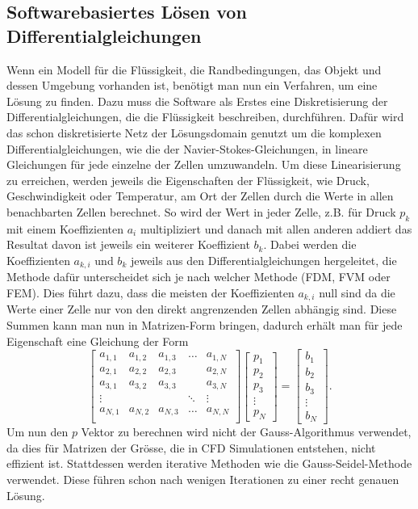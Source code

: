 \subsection{Softwarebasiertes Lösen von Differentialgleichungen}
Wenn ein Modell für die Flüssigkeit, die Randbedingungen, das Objekt und dessen Umgebung vorhanden ist, benötigt man nun ein Verfahren, um eine Lösung zu finden. 
Dazu muss die Software als Erstes eine Diskretisierung der Differentialgleichungen, die die Flüssigkeit beschreiben, durchführen.
Dafür wird das schon diskretisierte Netz der Lösungsdomain genutzt um die komplexen Differentialgleichungen, wie die der Navier-Stokes-Gleichungen, in lineare Gleichungen für jede einzelne der Zellen umzuwandeln.
Um diese Linearisierung zu erreichen, werden jeweils die Eigenschaften der Flüssigkeit, wie Druck, Geschwindigkeit oder Temperatur, am Ort der Zellen durch die Werte in allen benachbarten Zellen berechnet.
So wird der Wert in jeder Zelle, z.B. für Druck $p_{k}$ mit einem Koeffizienten $ a_{i} $ multipliziert und danach mit allen anderen addiert das Resultat davon ist jeweils ein weiterer Koeffizient $b_{k}$.
Dabei werden die Koeffizienten $a_{k,i}$ und $b_{k }$ jeweils aus den Differentialgleichungen hergeleitet, die Methode dafür unterscheidet sich je nach welcher Methode (FDM, FVM oder FEM).
Dies führt dazu, dass die meisten der Koeffizienten $a_{k,i}$ null sind da die Werte einer Zelle nur von den direkt angrenzenden Zellen abhängig sind.
Diese Summen kann man nun in Matrizen-Form bringen, dadurch erhält man für jede Eigenschaft eine Gleichung der Form
\begin{equation}
\begin{bmatrix}
	a_{1,1} &  a_{1,2} & a_{1,3} & \dots & a_{1,N} \\
	a_{2,1} &  a_{2,2} & a_{2,3} &  & a_{2,N} \\
	a_{3,1} &  a_{3,2} & a_{3,3} &  & a_{3,N} \\
	\vdots & &  & \ddots & \vdots \\
	a_{N,1} &  a_{N,2} & a_{N,3} & \dots & a_{N,N} \\
\end{bmatrix}
\begin{bmatrix}
	p_{1} \\
	p_{2} \\
	p_{3} \\
	\vdots \\
	p_{N}
\end{bmatrix}
= 
\begin{bmatrix}
b_{1} \\
b_{2} \\
b_{3} \\
\vdots \\
b_{N}
\end{bmatrix}
.
\end{equation}
Um nun den $p$ Vektor zu berechnen wird nicht der Gauss-Algorithmus verwendet, da dies für Matrizen der Grösse, die in CFD Simulationen entstehen, nicht effizient ist.
Stattdessen werden iterative Methoden wie die Gauss-Seidel-Methode verwendet.
Diese führen schon nach wenigen Iterationen zu einer recht genauen Lösung.